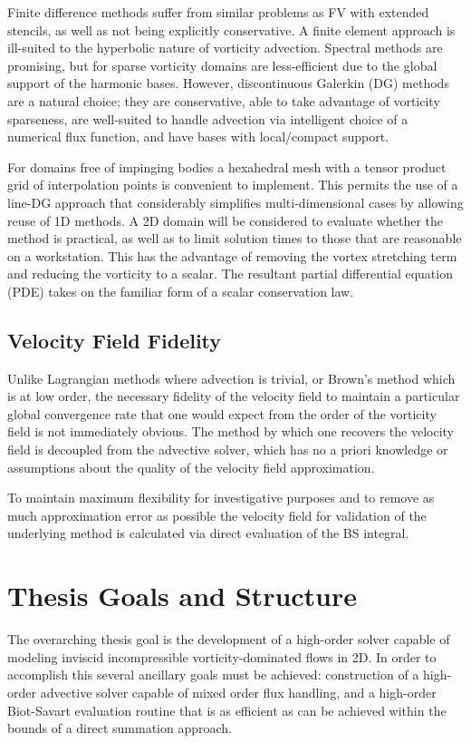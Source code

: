 \documentclass[letterpaper,12pt]{report}
\begin{document}
Finite difference methods suffer from similar problems as FV with extended stencils, as well as not being explicitly conservative. A finite element approach is ill-suited to the hyperbolic nature of vorticity advection. Spectral methods are promising, but for sparse vorticity domains are less-efficient due to the global support of the harmonic bases. However, discontinuous Galerkin (DG) methods are a natural choice; they are conservative, able to take advantage of vorticity sparseness, are well-suited to handle advection via intelligent choice of a numerical flux function, and have bases with local/compact support.

For domains free of impinging bodies a hexahedral mesh with a tensor product grid of interpolation points is convenient to implement. This permits the use of a line-DG \cite{Persson2013} approach that considerably simplifies multi-dimensional cases by allowing reuse of 1D methods. A 2D domain will be considered to evaluate whether the method is practical, as well as to limit solution times to those that are reasonable on a workstation. This has the advantage of removing the vortex stretching term and reducing the vorticity to a scalar. The resultant partial differential equation (PDE) takes on the familiar form of a scalar conservation law.

\subsection{Velocity Field Fidelity}
Unlike Lagrangian methods where advection is trivial, or Brown's method which is at low order, the necessary fidelity of the velocity field to maintain a particular global convergence rate that one would expect from the order of the vorticity field is not immediately obvious. The method by which one recovers the velocity field is decoupled from the advective solver, which has no a priori knowledge or assumptions about the quality of the velocity field approximation. 

To maintain maximum flexibility for investigative purposes and to remove as much approximation error as possible the velocity field for validation of the underlying method is calculated via direct evaluation of the BS integral.

\section{Thesis Goals and Structure}
The overarching thesis goal is the development of a high-order solver capable of modeling inviscid incompressible vorticity-dominated flows in 2D. In order to accomplish this several ancillary goals must be achieved: construction of a high-order advective solver capable of mixed order flux handling, and a high-order Biot-Savart evaluation routine that is as efficient as can be achieved within the bounds of a direct summation approach.
\end{document}
